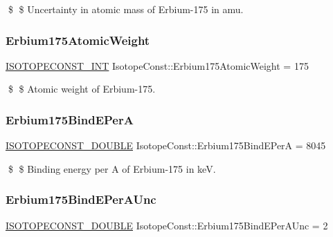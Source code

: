 \$ \$ Uncertainty in atomic mass of Erbium-\/175 in amu. \mbox{\label{group___isotope_const-_erbium-_er175_gac2b441a43bb12840b02bb4b09ecb2288}} 
\subsubsection{\texorpdfstring{Erbium175\+Atomic\+Weight}{Erbium175AtomicWeight}}
{\footnotesize\ttfamily \mbox{\hyperlink{group___isotope_const-_macros_ga5f18360b3e99483a35c32d789e62621c}{I\+S\+O\+T\+O\+P\+E\+C\+O\+N\+S\+T\+\_\+\+I\+NT}} Isotope\+Const\+::\+Erbium175\+Atomic\+Weight = 175}

\$ \$ Atomic weight of Erbium-\/175. \mbox{\label{group___isotope_const-_erbium-_er175_ga9433668ccd6791bb0b0371c188914f29}} 
\subsubsection{\texorpdfstring{Erbium175\+Bind\+E\+PerA}{Erbium175BindEPerA}}
{\footnotesize\ttfamily \mbox{\hyperlink{group___isotope_const-_macros_ga8f45a7272ce02c0b4c65c44636ed719a}{I\+S\+O\+T\+O\+P\+E\+C\+O\+N\+S\+T\+\_\+\+D\+O\+U\+B\+LE}} Isotope\+Const\+::\+Erbium175\+Bind\+E\+PerA = 8045}

\$ \$ Binding energy per A of Erbium-\/175 in keV. \mbox{\label{group___isotope_const-_erbium-_er175_ga30551790caf85812faefc3997f49655b}} 
\subsubsection{\texorpdfstring{Erbium175\+Bind\+E\+Per\+A\+Unc}{Erbium175BindEPerAUnc}}
{\footnotesize\ttfamily \mbox{\hyperlink{group___isotope_const-_macros_ga8f45a7272ce02c0b4c65c44636ed719a}{I\+S\+O\+T\+O\+P\+E\+C\+O\+N\+S\+T\+\_\+\+D\+O\+U\+B\+LE}} Isotope\+Const\+::\+Erbium175\+Bind\+E\+Per\+A\+Unc = 2}


